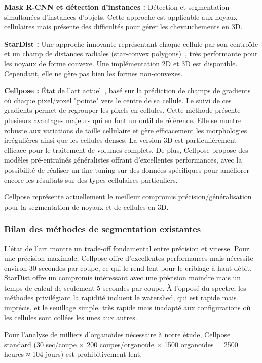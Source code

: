 \textbf{Mask R-CNN et détection d'instances :}
Détection et segmentation simultanées d'instances d'objets. Cette approche est applicable aux noyaux cellulaires mais présente des difficultés pour gérer les chevauchements en 3D.

\textbf{StarDist :}
Une approche innovante représentant chaque cellule par son centroïde et un champ de distances radiales (star-convex polygons)~\cite{Schmidt2018}, très performante pour les noyaux de forme convexe. Une implémentation 2D et 3D est disponible. Cependant, elle ne gère pas bien les formes non-convexes.

\textbf{Cellpose :}
État de l'art actuel~\cite{Stringer2021}, basé sur la prédiction de champs de gradients où chaque pixel/voxel "pointe" vers le centre de sa cellule. Le suivi de ces gradients permet de regrouper les pixels en cellules. Cette méthode présente plusieurs avantages majeurs qui en font un outil de référence. Elle se montre robuste aux variations de taille cellulaire et gère efficacement les morphologies irrégulières ainsi que les cellules denses. La version 3D est particulièrement efficace pour le traitement de volumes complets. De plus, Cellpose propose des modèles pré-entraînés généralistes offrant d'excellentes performances, avec la possibilité de réaliser un fine-tuning sur des données spécifiques pour améliorer encore les résultats sur des types cellulaires particuliers.

Cellpose représente actuellement le meilleur compromis précision/généralisation pour la segmentation de noyaux et de cellules en 3D.

\subsubsection{Bilan des méthodes de segmentation existantes}

L'état de l'art montre un trade-off fondamental entre précision et vitesse. Pour une précision maximale, Cellpose offre d'excellentes performances mais nécessite environ 30 secondes par coupe, ce qui le rend lent pour le criblage à haut débit. StarDist offre un compromis intéressant avec une précision moindre mais un temps de calcul de seulement 5 secondes par coupe. À l'opposé du spectre, les méthodes privilégiant la rapidité incluent le watershed, qui est rapide mais imprécis, et le seuillage simple, très rapide mais inadapté aux configurations où les cellules sont collées les unes aux autres.

Pour l'analyse de milliers d'organoïdes nécessaire à notre étude, Cellpose standard (30 sec/coupe × 200 coupes/organoïde × 1500 organoïdes = 2500 heures ≈ 104 jours) est prohibitivement lent.

